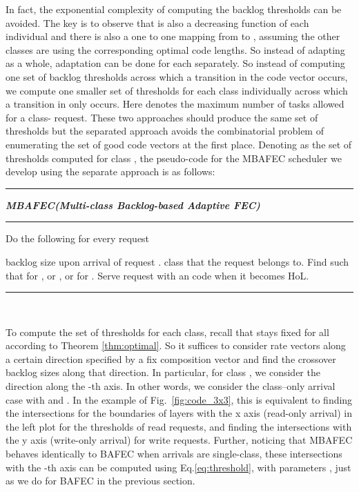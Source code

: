 \documentclass[journal]{IEEEtran}
\newcommand{\nonBlocking}{{BAFEC}\xspace}
\newcommand{\multiclass}{{MBAFEC}\xspace}
\begin{document}
In fact, the exponential complexity of computing the backlog thresholds can be avoided. The key is to observe that  is also a decreasing function of each individual  and there is also a one to one mapping from  to  , assuming the other classes are using the corresponding optimal code lengths. So instead of adapting  as a whole, adaptation can be done for each  separately. So instead of computing one set of  backlog thresholds across which a transition in the code vector  occurs, we compute one smaller set of  thresholds for each class  individually across which a transition in only  occurs. Here  denotes the maximum number of tasks allowed for a class- request. These two approaches should produce the same set of thresholds but the separated approach avoids the combinatorial problem of enumerating the set of good code vectors at the first place. Denoting  as the set of thresholds computed for class , the pseudo-code for the \multiclass scheduler we develop using the separate approach is as follows:

\vspace{4pt}
\hrule
\vspace{2pt}
\noindent \textit{\textbf{\multiclass (Multi-class Backlog-based Adaptive FEC)}}
\hrule
\vspace{2pt}


\noindent  Do the following for every request 

\begin{algorithmic} [1]

\STATE  backlog size upon arrival of request .
\STATE  class that the  request  belongs to.
\STATE Find  such that  for , or , or  for .
\STATE Serve request  with an  code when it becomes HoL.
\end{algorithmic}
\hrule

~

To compute the set of thresholds for each class, recall that  stays fixed for all  according to Theorem \ref{thm:optimal}. So it suffices to consider rate vectors along a certain direction specified by a fix composition vector  and find the crossover backlog sizes along that direction. In particular, for class , we consider the direction along the -th axis. In other words, we consider the class--only arrival case with  and . In the example of Fig.~\ref{fig:code_3x3}, this is equivalent to finding the 
intersections for the boundaries of layers with the x axis (read-only arrival) in the left plot for the thresholds of read requests, and finding the  intersections with the y axis (write-only arrival) for write requests. Further, noticing that \multiclass behaves identically to \nonBlocking when arrivals are single-class, these intersections with the -th axis can be computed using Eq.\ref{eq:threshold}, with parameters , just as we do  for \nonBlocking in the previous section.
\end{document}
